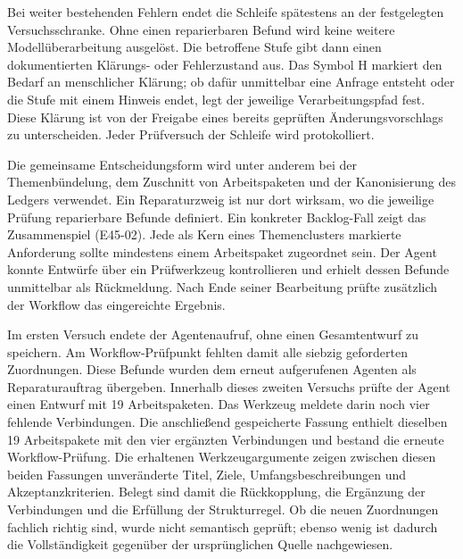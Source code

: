 Bei weiter bestehenden Fehlern endet die Schleife spätestens an
der festgelegten Versuchsschranke. Ohne einen reparierbaren Befund
wird keine weitere Modellüberarbeitung ausgelöst. Die betroffene
Stufe gibt dann einen dokumentierten Klärungs- oder Fehlerzustand
aus. Das Symbol H markiert den Bedarf an menschlicher Klärung;
ob dafür unmittelbar eine Anfrage entsteht oder die Stufe mit
einem Hinweis endet, legt der jeweilige Verarbeitungspfad fest.
Diese Klärung ist von der Freigabe eines bereits geprüften
Änderungsvorschlags zu unterscheiden. Jeder Prüfversuch der
Schleife wird protokolliert.

Die gemeinsame Entscheidungsform wird unter anderem bei der
Themenbündelung, dem Zuschnitt von Arbeitspaketen und der
Kanonisierung des Ledgers verwendet. Ein Reparaturzweig ist nur
dort wirksam, wo die jeweilige Prüfung reparierbare Befunde
definiert. Ein konkreter Backlog-Fall zeigt das Zusammenspiel
(E45-02). Jede als Kern eines Themenclusters markierte Anforderung
sollte mindestens einem Arbeitspaket zugeordnet sein. Der Agent
konnte Entwürfe über ein Prüfwerkzeug kontrollieren und erhielt
dessen Befunde unmittelbar als Rückmeldung. Nach Ende seiner
Bearbeitung prüfte zusätzlich der Workflow das eingereichte Ergebnis.

Im ersten Versuch endete der Agentenaufruf, ohne einen Gesamtentwurf
zu speichern. Am Workflow-Prüfpunkt fehlten damit alle siebzig
geforderten Zuordnungen. Diese Befunde wurden dem erneut aufgerufenen
Agenten als Reparaturauftrag übergeben. Innerhalb dieses zweiten Versuchs prüfte der Agent einen Entwurf
mit 19 Arbeitspaketen. Das Werkzeug meldete darin noch vier
fehlende Verbindungen. Die anschließend gespeicherte Fassung
enthielt dieselben 19 Arbeitspakete mit den vier ergänzten
Verbindungen und bestand die erneute Workflow-Prüfung.
Die erhaltenen Werkzeugargumente zeigen zwischen diesen beiden
Fassungen unveränderte Titel, Ziele, Umfangsbeschreibungen und
Akzeptanzkriterien. Belegt sind damit die Rückkopplung, die
Ergänzung der Verbindungen und die Erfüllung der Strukturregel.
Ob die neuen Zuordnungen fachlich richtig sind, wurde nicht
semantisch geprüft; ebenso wenig ist dadurch die Vollständigkeit
gegenüber der ursprünglichen Quelle nachgewiesen.

